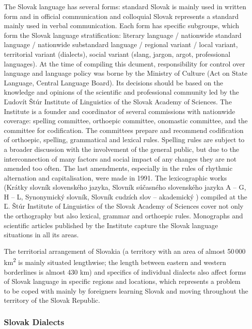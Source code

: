\begin{multicols}{2}
The Slovak language has several forms: standard Slovak is mainly used in
written form and in official communication and colloquial Slovak represents a
standard mainly used in verbal communication. Each form has specific subgroups,
which form the Slovak language stratification: literary language / nationwide
standard language / nationwide substandard language / regional variant / local
variant, territorial variant (dialects), social variant (slang, jargon, argot,
professional languages). At the time of compiling this dcument, responsibility
for control over language and language policy was borne by the Ministry of
Culture (Act on State Language, Central Language Board). Its decisions should
be based on the knowledge and opinions of the scientific and professional
community led by the Ľudovít Štúr Institute of Linguistics of the Slovak
Academy of Sciences. The Institute is a founder and coordinator of several
commissions with nationwide coverage: spelling committee, orthoepic committee,
onomastic committee, and the committee for codification. The committees prepare
and recommend codification of orthoepic, spelling, grammatical and lexical
rules. Spelling rules are subject to a broader discussion with the involvement
of the general public, but due to the interconnection of many factors and
social impact of any changes they are not amended too often. The last
amendments, especially in the rules of rhythmic alternation and capitalisation,
were made in 1991. The lexicographic works (Krátky slovník slovenského jazyka,
Slovník súčasného slovenského jazyka A -- G, H -- L, Synonymický slovník,
Slovník cudzích slov – akademický
\cite{kssj2003,sssj2006,sssj2011,sss2004,scs2005}) compiled at the Ľ. Štúr Institute of
Linguistics of the Slovak Academy of Sciences cover not only the orthography
but also lexical, grammar and orthoepic rules. Monographs and scientific
articles published by the Institute capture the Slovak language situations in
all its areas. 

The territorial arrangement of Slovakia (a territory with an area of
almost 50\,000 km\textsuperscript{2} is mainly situated lengthwise; the
length between eastern and western borderlines is almost 430 km) and
specifics of individual dialects also affect forms of Slovak language in
specific regions and locations, which represents a problem to be coped
with mainly by foreigners learning Slovak and moving throughout the
territory of the Slovak Republic.


\subsubsection{Slovak Dialects}


\end{multicols}
